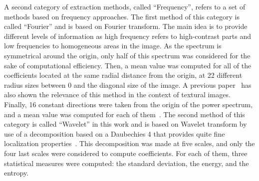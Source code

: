 \documentclass[journal,article,submit,moreauthors,pdftex, applsci]{Definitions/mdpi}
\begin{document}
A second category of extraction methods, called “Frequency”, refers to a set of methods based on frequency approaches. The first method of this category is called “Fourier” and is based on Fourier transform. The main idea is to provide different levels of information as high frequency refers to high-contrast parts and low frequencies to homogeneous areas in the image. As the spectrum is symmetrical around the origin, only half of this spectrum was considered for the sake of computational efficiency. Then, a mean value was computed for all of the coefficients located at the same radial distance from the origin, at 22 different radius sizes between 0 and the diagonal size of the image. A previous paper~\cite{Smach2008a} has also shown the relevance of this method in the context of textural images. Finally, 16 constant directions were taken from the origin of the power spectrum, and a mean value was computed for each of them~\cite{Wiltgen2008}. The second method of this category is called “Wavelet” in this work and is based on Wavelet transform by use of a decomposition based on a Daubechies 4 that provides quite fine localization properties~\cite{Wiltgen2008}. This decomposition was made at five scales, and only the four last scales were considered to compute coefficients. For each of them, three statistical measures were computed: the standard deviation, the energy, and the entropy.\par
                    
\end{document}
